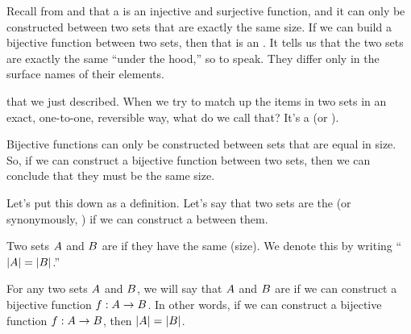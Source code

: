 \documentclass[../../../main.tex]{subfiles}
\begin{document}
\begin{aside}
  \begin{remark}
    Recall from  and  that a  is an injective and surjective function, and it can only be constructed between two sets that are exactly the same size. If we can build a bijective function between two sets, then that is an . It tells us that the two sets are exactly the same ``under the hood,'' so to speak. They differ only in the surface names of their elements.
  \end{remark}
\end{aside}

 that we just described. When we try to match up the items in two sets in an exact, one-to-one, reversible way, what do we call that? It's a  (or ).

Bijective functions can only be constructed between sets that are equal in size. So, if we can construct a bijective function between two sets, then we can conclude that they must be the same size.

Let's put this down as a definition. Let's say that two sets are the  (or synonymously, ) if we can construct a  between them.

\begin{terminology}
  Two sets $A$ and $B$ are  if they have the same  (size). We denote this by writing ``$|A| = |B|$.''
\end{terminology}

\begin{fdefinition}
  \label{def:equinumerosity}
  For any two sets $A$ and $B$, we will say that $A$ and $B$ are  if we can construct a bijective function $f: A \rightarrow B$. In other words, if we can construct a bijective function $f: A \rightarrow B$, then $|A| = |B|$.
\end{fdefinition}
\end{document}
